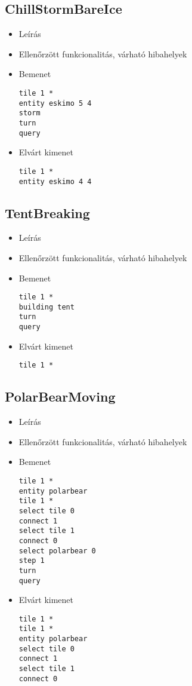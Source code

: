 \subsection{ChillStormBareIce}
\begin{itemize}
\item Leírás\newline
\item Ellenőrzött funkcionalitás, várható hibahelyek
\item Bemenet
\begin{lstlisting}
tile 1 *
entity eskimo 5 4
storm
turn
query
\end{lstlisting}
\item Elvárt kimenet
\begin{lstlisting}
tile 1 *
entity eskimo 4 4
\end{lstlisting}
\end{itemize}

\subsection{TentBreaking}
\begin{itemize}
\item Leírás\newline
\item Ellenőrzött funkcionalitás, várható hibahelyek
\item Bemenet
\begin{lstlisting}
tile 1 *
building tent
turn
query
\end{lstlisting}
\item Elvárt kimenet
\begin{lstlisting}
tile 1 *
\end{lstlisting}
\end{itemize}

\subsection{PolarBearMoving}
\begin{itemize}
\item Leírás\newline
\item Ellenőrzött funkcionalitás, várható hibahelyek
\item Bemenet
\begin{lstlisting}
tile 1 *
entity polarbear
tile 1 *
select tile 0
connect 1
select tile 1
connect 0
select polarbear 0
step 1
turn
query
\end{lstlisting}
\item Elvárt kimenet
\begin{lstlisting}
tile 1 *
tile 1 *
entity polarbear
select tile 0
connect 1
select tile 1
connect 0
\end{lstlisting}
\end{itemize}

